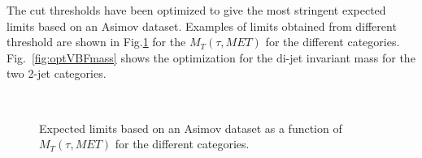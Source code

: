 The cut thresholds have been optimized to give the most stringent expected limits based on an Asimov dataset. Examples of limits obtained from different threshold are shown in Fig.\ref{fig:optMT} for the $M_T(\tau, MET)$ for the different categories. Fig.~\ref{fig:optVBFmass} shows the optimization for the di-jet invariant mass for the two 2-jet categories.

\begin{figure}[!htbp]
     \centering
     \\
     \caption{Expected limits based on an Asimov dataset as a function of $M_T(\tau, MET)$ for the different categories.}
     \label{fig:optMT}
\end{figure}

